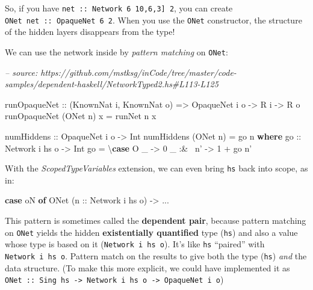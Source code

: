 \documentclass[]{article}
\newenvironment{Shaded}{}{}
\newcommand{\CommentTok}[1]{\textcolor[rgb]{0.38,0.63,0.69}{\textit{#1}}}
\newcommand{\DataTypeTok}[1]{\textcolor[rgb]{0.56,0.13,0.00}{#1}}
\newcommand{\DecValTok}[1]{\textcolor[rgb]{0.25,0.63,0.44}{#1}}
\newcommand{\FunctionTok}[1]{\textcolor[rgb]{0.02,0.16,0.49}{#1}}
\newcommand{\KeywordTok}[1]{\textcolor[rgb]{0.00,0.44,0.13}{\textbf{#1}}}
\newcommand{\NormalTok}[1]{#1}
\newcommand{\OtherTok}[1]{\textcolor[rgb]{0.00,0.44,0.13}{#1}}
\begin{document}
So, if you have \texttt{net\ ::\ Network\ 6\ \textquotesingle{}{[}10,6,3{]}\ 2},
you can create \texttt{ONet\ net\ ::\ OpaqueNet\ 6\ 2}. When you use the
\texttt{ONet} constructor, the structure of the hidden layers disappears from
the type!

We can use the network inside by \emph{pattern matching} on \texttt{ONet}:

\begin{Shaded}
\begin{Highlighting}[]
\CommentTok{-- source: https://github.com/mstksg/inCode/tree/master/code-samples/dependent-haskell/NetworkTyped2.hs#L113-L125}

\OtherTok{runOpaqueNet ::}\NormalTok{ (}\DataTypeTok{KnownNat}\NormalTok{ i, }\DataTypeTok{KnownNat}\NormalTok{ o)}
             \OtherTok{=>} \DataTypeTok{OpaqueNet}\NormalTok{ i o}
             \OtherTok{->} \DataTypeTok{R}\NormalTok{ i}
             \OtherTok{->} \DataTypeTok{R}\NormalTok{ o}
\NormalTok{runOpaqueNet (}\DataTypeTok{ONet}\NormalTok{ n) x }\FunctionTok{=}\NormalTok{ runNet n x}

\OtherTok{numHiddens ::} \DataTypeTok{OpaqueNet}\NormalTok{ i o }\OtherTok{->} \DataTypeTok{Int}
\NormalTok{numHiddens (}\DataTypeTok{ONet}\NormalTok{ n) }\FunctionTok{=}\NormalTok{ go n}
  \KeywordTok{where}
\OtherTok{    go ::} \DataTypeTok{Network}\NormalTok{ i hs o }\OtherTok{->} \DataTypeTok{Int}
\NormalTok{    go }\FunctionTok{=}\NormalTok{ \textbackslash{}}\KeywordTok{case}
        \DataTypeTok{O}\NormalTok{ _      }\OtherTok{->} \DecValTok{0}
\NormalTok{        _ }\FunctionTok{:&~}\NormalTok{ n' }\OtherTok{->} \DecValTok{1} \FunctionTok{+}\NormalTok{ go n'}
\end{Highlighting}
\end{Shaded}

With the \emph{ScopedTypeVariables} extension, we can even bring \texttt{hs}
back into scope, as in:

\begin{Shaded}
\begin{Highlighting}[]
\KeywordTok{case}\NormalTok{ oN }\KeywordTok{of}
  \DataTypeTok{ONet}\NormalTok{ (}\OtherTok{n ::} \DataTypeTok{Network}\NormalTok{ i hs o) }\OtherTok{->} \FunctionTok{...}
\end{Highlighting}
\end{Shaded}

This pattern is sometimes called the \textbf{dependent pair}, because pattern
matching on \texttt{ONet} yields the hidden \textbf{existentially quantified}
type (\texttt{hs}) and also a value whose type is based on it
(\texttt{Network\ i\ hs\ o}). It's like \texttt{hs} ``paired'' with
\texttt{Network\ i\ hs\ o}. Pattern match on the results to give both the type
(\texttt{hs}) \emph{and} the data structure. (To make this more explicit, we
could have implemented it as
\texttt{ONet\ ::\ Sing\ hs\ -\textgreater{}\ Network\ i\ hs\ o\ -\textgreater{}\ OpaqueNet\ i\ o})
\end{document}
